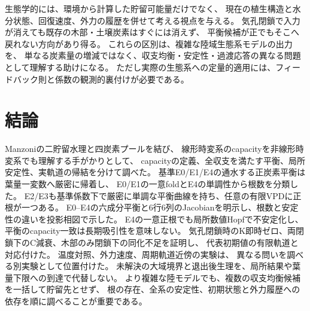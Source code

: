 \documentclass[a4paper,11pt]{ltjsarticle}
\begin{document}
生態学的には、環境から計算した貯留可能量だけでなく、
現在の植生構造と水分状態、回復速度、外力の履歴を併せて考える視点を与える。
気孔閉鎖で入力が消えても既存の木部・土壌炭素はすぐには消えず、
平衡候補が正でもそこへ戻れない方向があり得る。
これらの区別は、複雑な陸域生態系モデルの出力を、
単なる炭素量の増減ではなく、収支均衡・安定性・過渡応答の異なる問題として理解する助けになる。
ただし実際の生態系への定量的適用には、フィードバック則と係数の観測的裏付けが必要である。

\section{結論}
Manzoniの二貯留水理と四炭素プールを結び、
線形時変系のcapacityを非線形時変系でも理解する手がかりとして、
capacityの定義、全収支を満たす平衡、局所安定性、実軌道の帰結を分けて調べた。
基準E0/E1/E4の通水する正炭素平衡は葉量一変数へ厳密に帰着し、
E0/E1の一意foldとE4の単調性から根数を分類した。
E2/E3も基準係数下で厳密に単調な平衡曲線を持ち、任意の有限VPDに正根が一つある。
E0--E4の六成分平衡と6行6列のJacobianを明示し、根数と安定性の違いを投影相図で示した。
E4の一意正根でも局所数値Hopfで不安定化し、
平衡のcapacity一致は長期吸引性を意味しない。
気孔閉鎖時のK即時ゼロ、両閉鎖下のC減衰、木部のみ閉鎖下の同化不足を証明し、
代表初期値の有限軌道と対応付けた。
温度対照、外力速度、周期軌道近傍の実験は、
異なる問いを調べる別実験として位置付けた。
未解決の大域境界と退出後生理を、局所結果や葉量下限への到達で代替しない。
より複雑な陸モデルでも、複数の収支均衡候補を一括して貯留先とせず、
根の存在、全系の安定性、初期状態と外力履歴への依存を順に調べることが重要である。

\appendix
\end{document}
